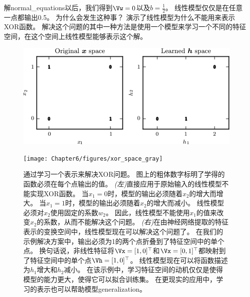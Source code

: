 解\gls{normal_equations}以后，我们得到$\Vw = 0$以及$b = \frac{1}{2}$。
线性模型仅仅是在任意一点都输出0.5。
为什么会发生这种事？
演示了线性模型为什么不能用来表示XOR函数。
解决这个问题的其中一种方法是使用一个模型来学习一个不同的特征空间，在这个空间上线性模型能够表示这个解。
\begin{figure}[!htb]
\ifOpenSource
\centerline{\includegraphics[scale=0.5]{images/43.png}}
\else
\centerline{\texttt{[image: Chapter6/figures/xor\_space\_gray]}}
\fi
\captionsetup{singlelinecheck=off}
\caption{通过学习一个表示来解决XOR问题。
图上的粗体数字标明了学得的函数必须在每个点输出的值。
\emph{(左)}直接应用于原始输入的线性模型不能实现XOR函数。
当$x_1 = 0$时，模型的输出必须随着$x_2$的增大而增大。
当$x_1 = 1$时，模型的输出必须随着$x_2$的增大而减小。
线性模型必须对$x_2$使用固定的系数$w_2$。
因此，线性模型不能使用$x_1$的值来改变$x_2$的系数，从而不能解决这个问题。 
\emph{(右)}在由神经网络提取的特征表示的变换空间中，线性模型现在可以解决这个问题了。
在我们的示例解决方案中，输出必须为1的两个点折叠到了特征空间中的单个点。
换句话说，非线性特征将$\Vx = [1, 0]^\top$和$\Vx = [0, 1]^\top$都映射到了特征空间中的单个点$\Vh = [1, 0]^\top$。
线性模型现在可以将函数描述为$h_1$增大和$h_2$减小。
在该示例中，学习特征空间的动机仅仅是使得模型的能力更大，使得它可以拟合训练集。
在更现实的应用中，学习的表示也可以帮助模型\gls{generalization}。}
\label{fig:chap6_xor_space_gray}
\end{figure}



